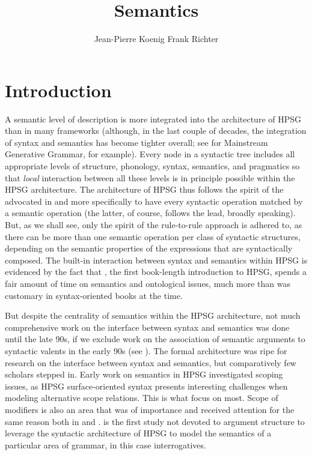 \documentclass[output=paper]{langsci/langscibook}
\author{%
	Jean-Pierre Koenig\affiliation{University at Buffalo}%
	\lastand Frank Richter\affiliation{Goethe Universität Frankfurt}%
}
\title{Semantics}
\begin{document}
\label{chap-semantics}

\section{Introduction} 

A semantic level of description is more integrated into the architecture of HPSG than in many frameworks  (although, in the last couple of decades, the integration of syntax and semantics has become tighter overall; see \citealt{HeimandKratzer1998} for Mainstream Generative Grammar, for example). Every node in a syntactic tree includes  all appropriate levels of structure, phonology, syntax, semantics, and pragmatics so that \emph{local} interaction between all these levels is in principle possible within the HPSG architecture. The architecture of HPSG thus follows the spirit of the  advocated in \citet{Bach1976} and more specifically \citet{KleinandSag1985} to have every syntactic operation matched by a semantic operation (the latter, of course, follows the  lead, broadly speaking). But, as we shall see, only the spirit of the rule-to-rule approach is adhered to, as there can be more than one semantic operation per class of syntactic structures, depending on the semantic properties of the expressions that are syntactically composed. The built-in interaction between syntax and semantics within HPSG is evidenced by the fact that \citet{PollardandSag1987}, the first book-length introduction to HPSG, spends a fair amount of time on semantics and ontological issues, much more than was customary in syntax-oriented books at the time.

But despite the centrality of semantics within the HPSG architecture, not much comprehensive work on the interface between syntax and semantics was done  until the late 90s, if we exclude work on the association of semantic arguments to syntactic valents in the early 90s (see ). The formal architecture was ripe for research on the interface between syntax and semantics, but comparatively few scholars stepped in. 
Early work on semantics in HPSG investigated scoping issues, as HPSG surface-oriented syntax presents interesting challenges when modeling alternative scope relations. This is what \citet{PollardandSag1987, PollardandSag1994} focus on most. Scope of modifiers is also an area that was of importance and received attention for the same reason both in \citet{PollardandSag1994} and \citet{Kasper1997}. \cite{GinzburgandSag2001} is the first study not devoted to argument structure to leverage the syntactic architecture of HPSG to model the semantics of a particular area of grammar, in this case interrogatives. 
\end{document}
